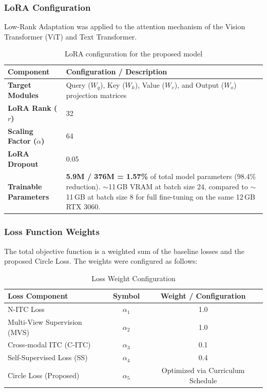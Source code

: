 \documentclass[../main.tex]{subfiles}
\begin{document}
\subsubsection{LoRA Configuration}
\noindent Low-Rank Adaptation was applied to the attention mechanism of the Vision Transformer (ViT) and Text Transformer.

\begin{table}[htbp]
    \centering
    \caption{LoRA configuration for the proposed model}
    \label{tab:lora_config}
    \begin{tabularx}{\textwidth}{lX}
        \toprule
        \textbf{Component} & \textbf{Configuration / Description} \\
        \midrule
        \textbf{Target Modules} & Query ($W_q$), Key ($W_k$), Value ($W_v$), and Output ($W_o$) projection matrices \\
        \textbf{LoRA Rank ($r$)} & 32 \\
        \textbf{Scaling Factor ($\alpha$)} & 64 \\
        \textbf{LoRA Dropout} & 0.05 \\
        \textbf{Trainable Parameters} & \textbf{5.9M / 376M = 1.57\%} of total model parameters (98.4\% reduction). $\sim$11\,GB VRAM at batch size 24, compared to $\sim$11\,GB at batch size 8 for full fine-tuning on the same 12\,GB RTX 3060. \\
        \bottomrule
    \end{tabularx}
\end{table}


\subsubsection{Loss Function Weights}
\noindent The total objective function is a weighted sum of the baseline losses and the proposed Circle Loss. The weights were configured as follows:

\begin{table}[htbp]
    \centering
    \caption{Loss Weight Configuration}
    \label{tab:loss_config}
    \begin{tabularx}{\textwidth}{Xcc}
        \toprule
        \textbf{Loss Component} & \textbf{Symbol} & \textbf{Weight / Configuration} \\
        \midrule
        N-ITC Loss & $\alpha_1$ & 1.0 \\
        Multi-View Supervision (MVS) & $\alpha_2$ & 1.0 \\
        Cross-modal ITC (C-ITC) & $\alpha_3$ & 0.1 \\
        Self-Supervised Loss (SS) & $\alpha_4$ & 0.4 \\
        Circle Loss (Proposed) & $\alpha_5$ & Optimized via Curriculum Schedule \\
        \bottomrule
    \end{tabularx}
\end{table}
\end{document}
